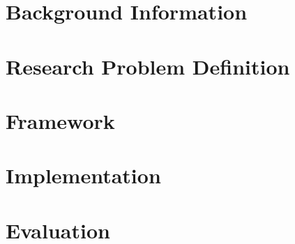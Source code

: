 \documentclass[a4paper,10pt,twoside]{report}
\begin{document}
\clearemptydoublepage

% 

\clearemptydoublepage

\chapter{Background Information}\label{chapter:background}


\clearemptydoublepage


\chapter{Research Problem Definition}\label{chapter:thesisoutline}


\clearemptydoublepage

\chapter{Framework}\label{chapter:framework}


\clearemptydoublepage

% 

\chapter{Implementation}\label{chapter:implementation}


\clearemptydoublepage

\chapter{Evaluation}\label{chapter:evaluation}


\clearemptydoublepage

% 
\end{document}
